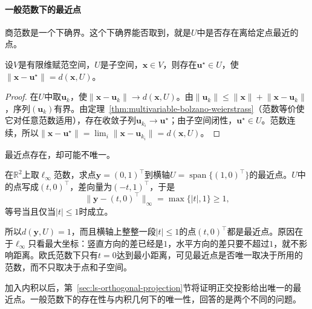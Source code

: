 \paragraph{一般范数下的最近点}
商范数是一个下确界。这个下确界能否取到，就是$U$中是否存在离给定点最近的点。
\begin{theorem}[最近点的存在]
\label{thm:multivariable-nearest-point-existence}
设$V$是有限维赋范空间，$U$是子空间，$\bm x\in V$，则存在$\bm u^\star\in U$，使$\lVert\bm x-\bm u^\star\rVert=d(\bm x,U)$。
\end{theorem}
\begin{proof}
在$U$中取$\bm u_k$，使$\lVert\bm x-\bm u_k\rVert\to d(\bm x,U)$。由$\lVert\bm u_k\rVert\leq\lVert\bm x\rVert+\lVert\bm x-\bm u_k\rVert$，序列$(\bm u_k)$有界。由定理~\ref{thm:multivariable-bolzano-weierstrass}（范数等价使它对任意范数适用），存在收敛子列$\bm u_{k_i}\to\bm u^\star$；由子空间闭性，$\bm u^\star\in U$。范数连续，所以$\lVert\bm x-\bm u^\star\rVert=\lim_i\lVert\bm x-\bm u_{k_i}\rVert=d(\bm x,U)$。
\end{proof}
最近点存在，却可能不唯一。
\begin{example}
\label{ex:ls-linf-nonunique-nearest}
在$\mathbb R^2$上取$\ell_\infty$范数，求点$\bm y=(0,1)^\top$到横轴$U=\operatorname{span}\{(1,0)^\top\}$的最近点。$U$中的点写成$(t,0)^\top$，差向量为$(-t,1)^\top$，于是
\[
 \lVert\bm y-(t,0)^\top\rVert_\infty=\max\{|t|,1\}\geq1,
\]
等号当且仅当$|t|\leq1$时成立。

所以$d(\bm y,U)=1$，而且横轴上整整一段$|t|\leq1$的点$(t,0)^\top$都是最近点。原因在于$\ell_\infty$只看最大坐标：竖直方向的差已经是$1$，水平方向的差只要不超过$1$，就不影响距离。欧氏范数下只有$t=0$达到最小距离，可见最近点是否唯一取决于所用的范数，而不只取决于点和子空间。
\end{example}
加入内积以后，第~\ref{sec:ls-orthogonal-projection}节将证明正交投影给出唯一的最近点。一般范数下的存在性与内积几何下的唯一性，回答的是两个不同的问题。

